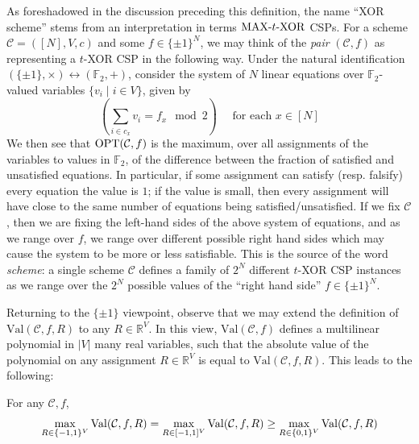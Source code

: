 As foreshadowed in the discussion preceding this definition, the name ``XOR scheme'' stems from an interpretation in terms $\mathrm{MAX}\text{-} t\text{-}\mathrm{XOR}$ CSPs. For a scheme $\mathcal{C}= ([N], V,c)$ and some $f \in \{\pm 1\}^N$, we may think of the \emph{pair} $(\mathcal{C},f)$ as representing a $t$-XOR CSP in the following way. Under the natural identification $(\{\pm 1\},\times) \leftrightarrow (\mathbb{F}_2,+)$, consider the system of $N$ linear equations over $\mathbb{F}_2$-valued variables $\{v_i \mid i \in V\}$, given by
\[
(\sum_{i \in c_x} v_i  = f_x \mod 2 )\quad \text{ for each }x \in [N]
\]
We then see that $\mathrm{OPT}(\mathcal{C},f)$ is the maximum, over all assignments of the variables to values in $\mathbb{F}_2$, of the difference between the fraction of satisfied and unsatisfied equations.  In particular, if some assignment can satisfy (resp. falsify) every equation the value is $1$; if the value is small, then every assignment will have close to the same number of equations being satisfied/unsatisfied. 
If we fix $\mathcal{C}$, then we are fixing the left-hand sides of the above system of equations, and as we range over $f$, we range over different possible right hand sides which may cause the system to be more or less satisfiable. This is the source of the word \emph{scheme}: a single scheme $\mathcal{C}$ defines a family of $2^N$ different $t$-XOR CSP instances as we range over the $2^N$ possible values of the ``right hand side'' $f\in \{\pm 1\}^N$.


Returning to the $\{\pm 1\}$ viewpoint, observe that we may extend the definition of $\mathrm{Val}(\mathcal{C},f,R)$ to any $R \in \mathbb{R}^V$. In this view, $\mathrm{Val}(\mathcal{C},f)$ defines a multilinear polynomial in $|V|$ many real variables, such that the absolute value of the polynomial on any assignment $R \in \mathbb{R}^V$ is equal to $\mathrm{Val}(\mathcal{C},f,R)$. This leads to the following:
\begin{observation}\label{cellprobe:obs:multilin}
For any $\mathcal{C},f$,
\[
\max_{R\in \{-1,1\}^V} \mathrm{Val} (\mathcal{C},f,R) = \max_{R\in [-1,1]^V} \mathrm{Val} (\mathcal{C},f,R) \geq \max_{R\in \{0,1\}^V} \mathrm{Val} (\mathcal{C},f,R) 
\]
\end{observation}

